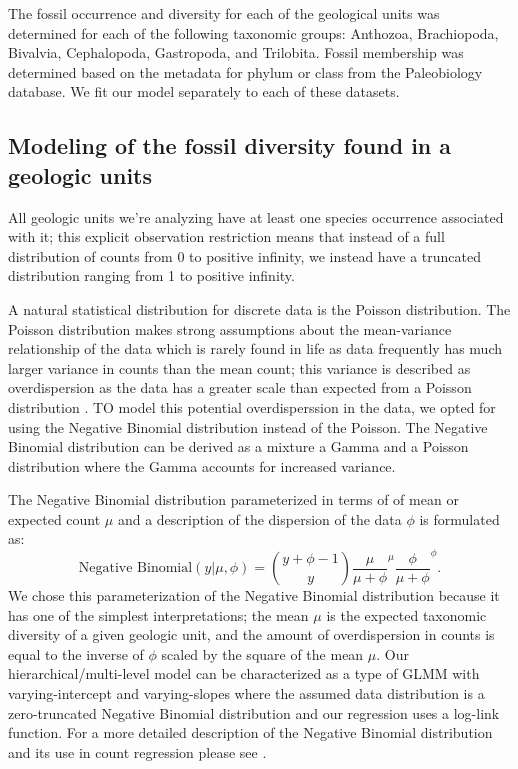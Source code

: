 \documentclass[12pt,letterpaper]{article}
\begin{document}
The fossil occurrence and diversity for each of the geological units was determined for each of the following taxonomic groups: Anthozoa, Brachiopoda, Bivalvia, Cephalopoda, Gastropoda, and Trilobita. Fossil membership was determined based on the metadata for phylum or class from the Paleobiology database. We fit our model separately to each of these datasets.





\subsection{Modeling of the fossil diversity found in a geologic units}

All geologic units we're analyzing have at least one species occurrence associated with it; this explicit observation restriction means that instead of a full distribution of counts from 0 to positive infinity, we instead have a truncated distribution ranging from 1 to positive infinity.

A natural statistical distribution for discrete data is the Poisson distribution. The Poisson distribution makes strong assumptions about the mean-variance relationship of the data which is rarely found in life as data frequently has much larger variance in counts than the mean count; this variance is described as overdispersion as the data has a greater scale than expected from a Poisson distribution \citep{ARM,BDA3}. TO model this potential overdisperssion in the data, we opted for using the Negative Binomial distribution instead of the Poisson. The Negative Binomial distribution can be derived as a mixture a Gamma and a Poisson distribution where the Gamma accounts for increased variance.

The Negative Binomial distribution parameterized in terms of of mean or expected count \(\mu\) and a description of the dispersion of the data \(\phi\) is formulated as:
\begin{equation}
  \text{Negative Binomial}(y | \mu, \phi) = \binom{y + \phi - 1}{y} \frac{\mu}{\mu + \phi}^{\mu} \frac{\phi}{\mu + \phi}^{\phi}.
\end{equation}
We chose this parameterization of the Negative Binomial distribution because it has one of the simplest interpretations; the mean \(\mu\) is the expected taxonomic diversity of a given geologic unit, and the amount of overdispersion in counts is equal to the inverse of \(\phi\) scaled by the square of the mean \(\mu\). Our hierarchical/multi-level model can be characterized as a type of GLMM with varying-intercept and varying-slopes where the assumed data distribution is a zero-truncated Negative Binomial distribution and our regression uses a log-link function. For a more detailed description of the Negative Binomial distribution and its use in count regression please see \citet{ARM}.
\end{document}
